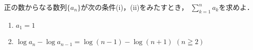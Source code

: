 \documentclass[../../main.tex]{subfiles}
\begin{document}
正の数からなる数列$\{ a_n \}$が次の条件(i)，(ii)をみたすとき，
$\displaystyle\sum_{k=1}^n a_k$を求めよ．
\begin{enumerate}
  \item[(i)] $a_1=1$
  \item[(ii)] $\log a_n - \log a_{n-1} = \log(n-1)-\log(n+1)$ $(n \geqq 2)$
\end{enumerate}
\end{document}
